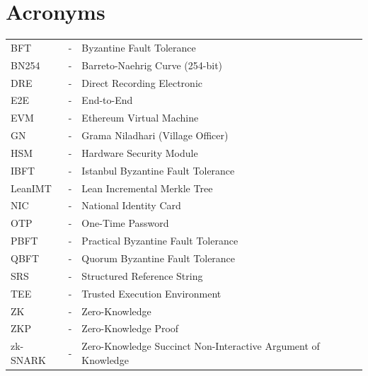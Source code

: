 \chapter*{Acronyms}

\noindent \begin{tabular}{lcl}
BFT & - & Byzantine Fault Tolerance\\
BN254 & - & Barreto-Naehrig Curve (254-bit)\\
DRE & - & Direct Recording Electronic\\
E2E & - & End-to-End\\
EVM & - & Ethereum Virtual Machine\\
GN & - & Grama Niladhari (Village Officer)\\
HSM & - & Hardware Security Module\\
IBFT & - & Istanbul Byzantine Fault Tolerance\\
LeanIMT & - & Lean Incremental Merkle Tree\\
NIC & - & National Identity Card\\
OTP & - & One-Time Password\\
PBFT & - & Practical Byzantine Fault Tolerance\\
QBFT & - & Quorum Byzantine Fault Tolerance\\
SRS & - & Structured Reference String\\
TEE & - & Trusted Execution Environment\\
ZK & - & Zero-Knowledge\\
ZKP & - & Zero-Knowledge Proof\\
zk-SNARK & - & Zero-Knowledge Succinct Non-Interactive Argument of Knowledge\\
\end{tabular} 


